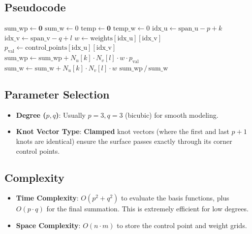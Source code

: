 \subsection{Pseudocode}
\begin{algorithm}
\caption{Evaluate NURBS Surface}
\label{alg:evaluate_nurbs_surface}
\begin{algorithmic}[1]
    \State {}
    \State {}
    \State {}
    \State {}
    \State $\text{sum\_wp} \gets \mathbf{0}$
    \State $\text{sum\_w} \gets 0$
        \State $\text{temp} \gets \mathbf{0}$
        \State $\text{temp\_w} \gets 0$
            \State $\text{idx\_u} \gets \text{span\_u} - p + k$
            \State $\text{idx\_v} \gets \text{span\_v} - q + l$
            \State $w \gets \text{weights}[\text{idx\_u}][\text{idx\_v}]$
            \State $p_\text{val} \gets \text{control\_points}[\text{idx\_u}][\text{idx\_v}]$
            \State $\text{sum\_wp} \gets \text{sum\_wp} + N_u[k] \cdot N_v[l] \cdot w \cdot p_\text{val}$
            \State $\text{sum\_w} \gets \text{sum\_w} + N_u[k] \cdot N_v[l] \cdot w$
        \EndFor
    \EndFor
    \State \Return $\text{sum\_wp} \,/\, \text{sum\_w}$
\EndFunction
\end{algorithmic}
\end{algorithm}

\subsection{Parameter Selection}
\begin{itemize}
\item \textbf{Degree ($p, q$)}: Usually $p=3, q=3$ (bicubic) for smooth modeling.
\item \textbf{Knot Vector Type}: \textbf{Clamped} knot vectors (where the first and last $p+1$ knots are identical) ensure the surface passes exactly through its corner control points.
\end{itemize}

\subsection{Complexity}
\begin{itemize}
\item \textbf{Time Complexity}: $O(p^2 + q^2)$ to evaluate the basis functions, plus $O(p \cdot q)$ for the final summation. This is extremely efficient for low degrees.
\item \textbf{Space Complexity}: $O(n \cdot m)$ to store the control point and weight grids.
\end{itemize}

